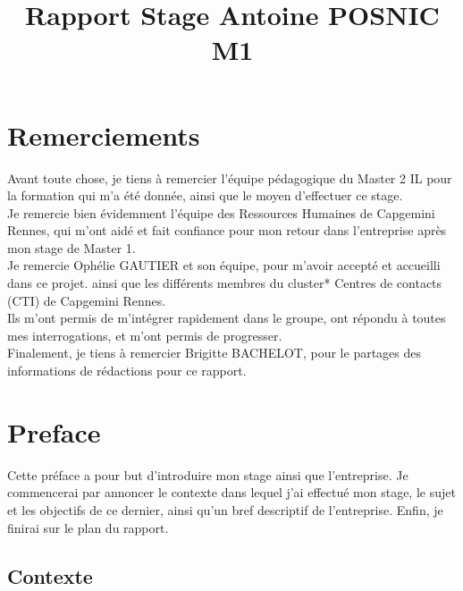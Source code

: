 \documentclass{rapport}
\title{Rapport Stage Antoine POSNIC M1} %
\begin{document}





        
\fairemarges %
\fairepagedegarde %
\tabledematieres %

\section*{Remerciements}
Avant toute chose, je tiens à remercier l'équipe pédagogique du Master 2 IL pour la formation qui m'a été donnée, ainsi que le moyen d'effectuer ce stage.\\
Je remercie bien évidemment l'équipe des Ressources Humaines de Capgemini Rennes, qui m'ont aidé et fait confiance pour mon retour dans l'entreprise après mon stage de Master 1.\\
Je remercie Ophélie GAUTIER et son équipe, pour m'avoir accepté et accueilli dans ce projet. ainsi que les différents membres du cluster* Centres de contacts (CTI) de Capgemini Rennes.\\
Ils m'ont permis de m'intégrer rapidement dans le groupe, ont répondu à toutes mes interrogations, et m'ont permis de progresser.\\
Finalement, je tiens à remercier Brigitte BACHELOT, pour le partages des informations de rédactions pour ce rapport.
\newpage
\section*{Preface}
Cette préface a pour but d'introduire mon stage ainsi que l'entreprise. Je commencerai par annoncer le contexte dans lequel j'ai effectué mon stage, le sujet et les objectifs de ce dernier, ainsi qu'un bref descriptif de l'entreprise. Enfin, je finirai sur le plan du rapport.

\subsection*{Contexte}
\end{document}
